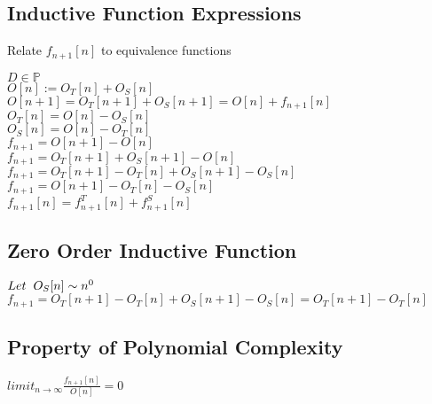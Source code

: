 \documentclass[11pt]{article}
\begin{document}
\subsection{Inductive Function Expressions}
Relate $f_{n+1}[n]$ to equivalence functions
\begin{center}
$
D \in \mathbb{P}
$
\\ \vspace{2mm}
$
O[n] := O_T[n] + O_S[n]
$
\\ \vspace{2mm}
$
O[n+1] = O_T[n+1] + O_S[n+1] = O[n] + f_{n+1}[n]
$
\\ \vspace{2mm}
$
O_T[n] = O[n] - O_S[n]
$
\\ \vspace{2mm}
$
O_S[n] = O[n] - O_T[n]
$
\\ \vspace{8mm}
$
f_{n+1} = O[n+1] - O[n]
$
\\ \vspace{2mm}
$
f_{n+1} = O_T[n+1] + O_S[n+1] - O[n]
$
\\ \vspace{2mm}
$
f_{n+1} = O_T[n+1] - O_T[n] + O_S[n+1] - O_S[n]
$
\\ \vspace{2mm}
$
f_{n+1} = O[n+1] - O_T[n] - O_S[n]
$
\\ \vspace{2mm}
$
f_{n+1}[n] =  f^T_{n+1}[n] +  f^S_{n+1}[n]
$
\end{center}






\subsection{Zero Order Inductive Function}
\begin{center}
$
Let \hspace{2mm} O_S[n] \sim n^0
$
\\ \vspace{2mm}
$
f_{n+1} = O_T[n+1] - O_T[n] + O_S[n+1] - O_S[n] = O_T[n+1] - O_T[n]
$
\end{center}


\subsection{Property of Polynomial Complexity}
\begin{center}
$
limit_{n \rightarrow \infty } \frac{f_{n+1}[n]}{O[n]} = 0
$
\end{center}
\end{document}
